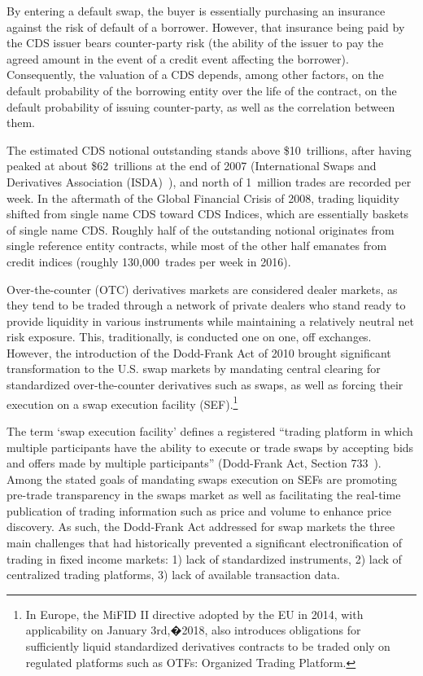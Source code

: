 By entering a default swap, the buyer is essentially purchasing an insurance against the risk of default of a borrower. However, that insurance being paid by the CDS issuer bears counter-party risk (the ability of the issuer to pay the agreed amount in the event of a credit event affecting the borrower). Consequently, the valuation of a CDS depends, among other factors, on the default probability of the borrowing entity over the life of the contract, on the default probability of issuing counter-party, as well as the correlation between them.


The estimated CDS notional outstanding stands above \$10~trillions, after having peaked at about \$62~trillions at the end of 2007 (International Swaps and Derivatives Association (ISDA)~\cite{ISDA}), and north of 1~million trades are recorded per week. In the aftermath of the Global Financial Crisis of 2008, trading liquidity shifted from single name CDS toward CDS Indices, which are essentially baskets of single name CDS. Roughly half of the outstanding notional originates from single reference entity contracts, while most of the other half emanates from credit indices (roughly 130,000~trades per week in 2016).


Over-the-counter (OTC) derivatives markets are considered dealer markets, as they tend to be traded through a network of private dealers who stand ready to provide liquidity in various instruments while maintaining a relatively neutral net risk exposure. This, traditionally, is conducted one on one, off exchanges. However, the introduction of the Dodd-Frank Act of 2010 brought significant transformation to the U.S. swap markets by mandating central clearing for standardized over-the-counter derivatives such as swaps, as well as forcing their execution on a swap execution facility (SEF).\footnote{In Europe, the MiFID II directive adopted by the EU in 2014, with applicability on January 3rd,�2018, also introduces obligations for sufficiently liquid standardized derivatives contracts to be traded only on regulated platforms such as OTFs: Organized Trading Platform.}


The term `swap execution facility' defines a registered ``trading platform in which multiple participants have the ability to execute or trade swaps by accepting bids and offers made by multiple participants'' (Dodd-Frank Act, Section 733~\cite{DoddFrank}). Among the stated goals of mandating swaps execution on SEFs are promoting pre-trade transparency in the swaps market as well as facilitating the real-time publication of trading information such as price and volume to enhance price discovery. As such, the Dodd-Frank Act addressed for swap markets the three main challenges that had historically prevented a significant electronification of trading in fixed income markets: 1) lack of standardized instruments, 2) lack of centralized trading platforms, 3) lack of available transaction data.


